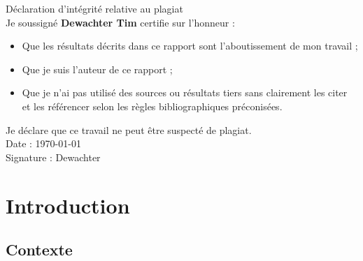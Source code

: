 \documentclass[12pt, a4paper]{article}
\begin{document}
\newpage
\begin{center}
  \vspace*{\fill}

  Déclaration d'intégrité relative au plagiat \\

  

  Je soussigné \textbf{Dewachter Tim} certifie sur l'honneur : \\

  \begin{itemize}
    \centering
    \item Que les résultats décrits dans ce rapport sont l'aboutissement de mon travail ;\\
    \item Que je suis l'auteur de ce rapport ;\\
    \item Que je n'ai pas utilisé des sources ou résultats tiers sans clairement les citer et les référencer selon les règles bibliographiques préconisées.\\
  \end{itemize}

  Je déclare que ce travail ne peut être suspecté de plagiat. \\


  Date : \today\\

  

  Signature : Dewachter

  \vspace*{\fill}
\end{center}
\newpage

\tableofcontents

\newpage

\section{Introduction}

\subsection{Contexte}
\end{document}
